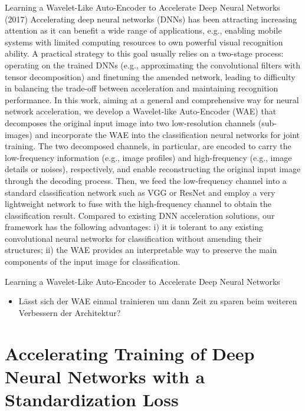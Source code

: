 \documentclass[10pt]{beamer}
\begin{document}
\begin{frame}{Learning a Wavelet-Like Auto-Encoder
to Accelerate Deep Neural Networks (2017)}
Accelerating deep neural networks (DNNs) has been attracting increasing attention as it can benefit a wide range of applications, e.g., enabling mobile systems with limited computing resources to own powerful visual recognition ability.
A practical strategy to this goal usually relies on a two-stage
process: operating on the trained DNNs (e.g., approximating
the convolutional filters with tensor decomposition) and finetuning the amended network, leading to difficulty in balancing the trade-off between acceleration and maintaining recognition performance. In this work, aiming at a general and
comprehensive way for neural network acceleration, we develop a Wavelet-like Auto-Encoder (WAE) that decomposes
the original input image into two low-resolution channels
(sub-images) and incorporate the WAE into the classification
neural networks for joint training. The two decomposed channels, in particular, are encoded to carry the low-frequency information (e.g., image profiles) and high-frequency (e.g., image details or noises), respectively, and enable reconstructing
the original input image through the decoding process. Then,
we feed the low-frequency channel into a standard classification network such as VGG or ResNet and employ a very
lightweight network to fuse with the high-frequency channel
to obtain the classification result. Compared to existing DNN
acceleration solutions, our framework has the following advantages: i) it is tolerant to any existing convolutional neural networks for classification without amending their structures; ii) the WAE provides an interpretable way to preserve the main components of the input image for classification. 
\end{frame}

\begin{frame}{Learning a Wavelet-Like Auto-Encoder
to Accelerate Deep Neural Networks}
 \begin{itemize}
   \item Lässt sich der WAE einmal trainieren um dann Zeit zu sparen beim weiteren Verbessern der Architektur?
  \end{itemize}

\end{frame}



\section{Accelerating Training of Deep Neural Networks with a Standardization Loss}
\end{document}

